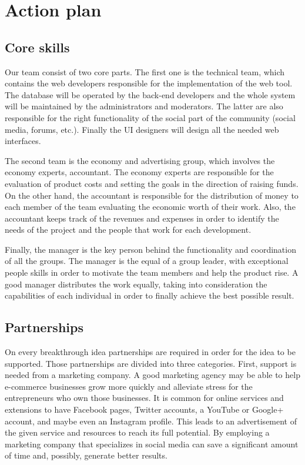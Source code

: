 \section{Action plan}

\subsection{Core skills}

Our team consist of two core parts.
The first one is the technical team, which contains the web developers 
responsible for the implementation of the web tool. The database will be 
operated by the back-end developers and the whole system will be maintained by 
the administrators and moderators. The latter are also responsible for the right 
functionality of the social part of the community (social media, forums, etc.).
Finally the UI designers will design all the needed web interfaces.

The second team is the economy and advertising group, which involves the economy 
experts, accountant. The economy experts are responsible for the evaluation of 
product costs and setting the goals in the direction of raising funds. On the 
other hand, the accountant is responsible for the distribution of money to each 
member of the team evaluating the economic worth of their work. Also, the 
accountant keeps track of the revenues and expenses in order to identify the 
needs of the project and the people that work for each development.

Finally, the manager is the key person behind the functionality and coordination 
of all the groups. The manager is the equal of a group leader, with exceptional 
people skills in order to motivate the team members and help the product rise. 
A good manager distributes the work equally, taking into consideration the 
capabilities of each individual in order to finally achieve the best possible 
result.

\subsection{Partnerships}

On every breakthrough idea partnerships are required in order for the idea to be 
supported. Those partnerships are divided into three categories.
First, support is needed from a marketing company. A good marketing agency may 
be able to help e-commerce businesses grow more quickly and alleviate stress for 
the entrepreneurs who own those businesses. It is common for online services and 
extensions to have Facebook pages, Twitter accounts, a YouTube or Google+ 
account, and maybe even an Instagram profile. This leads to an advertisement of 
the given service and resources to reach its full potential. By employing a 
marketing company that specializes in social media can save a significant amount 
of time and, possibly, generate better results.

